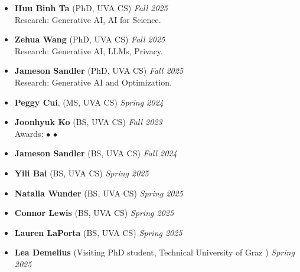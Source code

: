\begin{itemize}
  \item \textbf{Huu Binh Ta} (PhD, {\sc UVA} CS)
  \hfill{\em Fall 2025}\\
  {\sc Research:} Generative AI, AI for Science.

  \item \textbf{Zehua Wang} (PhD, {\sc UVA} CS)
  \hfill{\em Fall 2025}\\
  {\sc Research:} Generative AI, LLMs, Privacy.

  \item \textbf{Jameson Sandler} (PhD, {\sc UVA} CS)
  \hfill{\em Fall 2025}\\
  {\sc Research:} Generative AI and Optimization.

\end{itemize}

\begin{itemize}
  \item  \textbf{Peggy Cui}, ({\sc MS, UVA} CS)  \hfill{\em Spring 2024}
  \item  \textbf{Joonhyuk Ko} ({\sc BS, UVA} CS)  \hfill{\em Fall 2023}\\
  {\sc Awards:} 
    $\bullet$  
    $\bullet$ 
  \item  \textbf{Jameson Sandler} ({\sc BS, UVA} CS)  \hfill{\em Fall 2024}
  \item \textbf{Yili Bai} ({\sc BS, UVA} CS)  \hfill{\em Spring 2025}
  \item \textbf{Natalia Wunder} ({\sc BS, UVA} CS)  \hfill{\em Spring 2025}
  \item \textbf{Connor Lewis} ({\sc BS, UVA} CS)  \hfill{\em Spring 2025}
  \item \textbf{Lauren LaPorta} ({\sc BS, UVA} CS)  \hfill{\em Spring 2025}
\end{itemize}

\begin{itemize}
  \item  \textbf{Lea Demelius} ({\sc Visiting PhD student, Technical University of Graz })  \hfill{\em Spring 2025}
\end{itemize}


